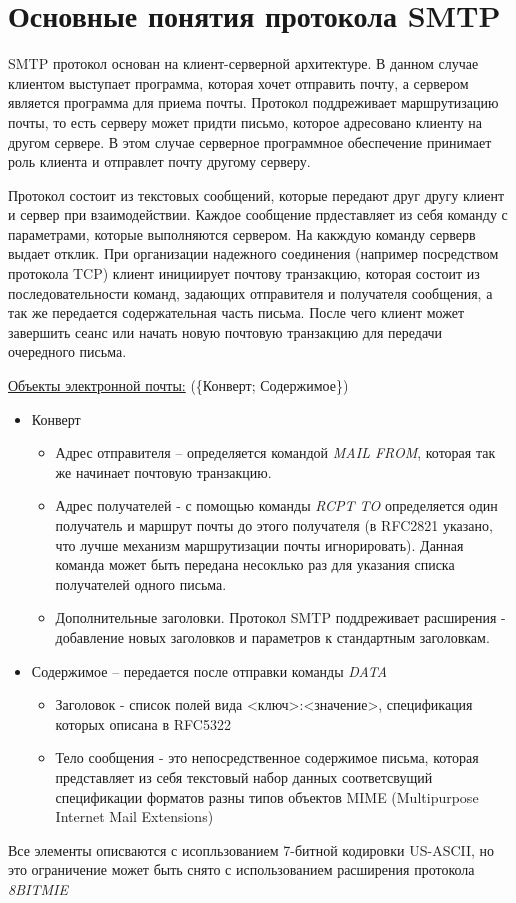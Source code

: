 \documentclass[a4paper,12pt]{report}
\begin{document}
	\section{Основные понятия протокола SMTP}

	 SMTP протокол основан на клиент-серверной архитектуре. В данном случае клиентом выступает программа, которая хочет отправить почту, а сервером является программа для приема почты. Протокол поддреживает маршрутизацию почты, то есть серверу может придти письмо, которое адресовано клиенту на другом сервере. В этом случае серверное программное обеспечение принимает роль клиента и отправлет почту другому серверу. 

	 Протокол состоит из текстовых сообщений, которые передают друг другу клиент и сервер при взаимодействии. Каждое сообщение прдеставляет из себя команду с параметрами, которые выполняются сервером. На какждую команду серверв выдает отклик. При организации надежного соединения (например посредством протокола TCP) клиент инициирует почтову транзакцию, которая состоит из последовательности команд, задающих отправителя и получателя сообщения, а так же передается содержательная часть письма. После чего клиент может завершить сеанс или начать новую почтовую транзакцию для передачи очередного письма.

	 \underline{Объекты электронной почты:} (\{Конверт; Содержимое\})
	 \begin{itemize}
	 	\item Конверт
	 	   \begin{itemize}
	 	       \item Адрес отправителя -- определяется командой \textit{MAIL FROM}, которая так же начинает почтовую транзакцию. 
	 	       \item Адрес получателей - с помощью команды \textit{RCPT TO} определяется один получатель и маршрут почты до этого получателя (в RFC2821 указано, что лучше механизм маршрутизации почты игнорировать). Данная команда может быть передана несоклько раз для указания списка получателей одного письма.
	 	       \item Дополнительные заголовки. Протокол SMTP поддреживает расширения - добавление новых заголовков и параметров к стандартным заголовкам.
	 	   \end{itemize}
	 	  \item Содержимое -- передается после отправки команды \textit{DATA}
	 	  \begin{itemize}
	 	      \item Заголовок - список полей вида <ключ>:<значение>, спецификация которых описана в RFC5322
	 	      \item Тело сообщения - это непосредственное содержимое письма, которая представляет из себя текстовый набор данных соответсвущий спецификации форматов разны типов объектов MIME (Multipurpose Internet Mail Extensions)
	 	  \end{itemize}
	 \end{itemize}
	 Все элементы описваются с исопльзованием 7-битной кодировки US-ASCII, но это ограничение может быть снято с использованием расширения протокола \textit{8BITMIE}
	
\end{document}
